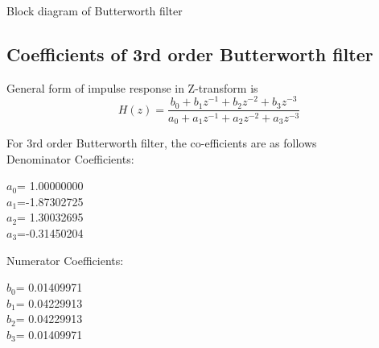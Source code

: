 \documentclass[journal,10pt,twocolumn]{article}
\begin{document}
\vspace{0.2cm}
    
\begin{flushleft}
\hspace{1cm} Block diagram of Butterworth filter  \\
\end{flushleft}

\subsection{Coefficients of 3rd order Butterworth filter} 
\vspace{0.25cm}
\begin{flushleft}

General form of impulse response in Z-transform is\\
\begin{equation}
H(z)= \frac{b_0 + b_1 z^{-1} + b_2 z^{-2} + b_3 z^{-3}}{a_0 + a_1 z^{-1}+ a_2 z^{-2} + a_3 z^{-3}}
\end{equation}

For 3rd order Butterworth filter, the co-efficients are as follows\\
\vspace{0.25cm}
Denominator Coefficients:\\
\vspace{0.1cm}
\begin{center}
$a_0$= 1.00000000 \\
\vspace{0.1cm}
$a_1$=-1.87302725 \\ 
\vspace{0.1cm}
$a_2$= 1.30032695 \\
\vspace{0.1cm}
$a_3$=-0.31450204 \\
\end{center}
\vspace{0.25cm}
Numerator Coefficients:\\  
\vspace{0.1cm}
\begin{center}
    
$b_0$= 0.01409971 \\ 
\vspace{0.1cm}
$b_1$= 0.04229913 \\
\vspace{0.1cm}
$b_2$= 0.04229913 \\
\vspace{0.1cm}
$b_3$= 0.01409971 \\
\end{center}
\end{flushleft}
\end{document}

